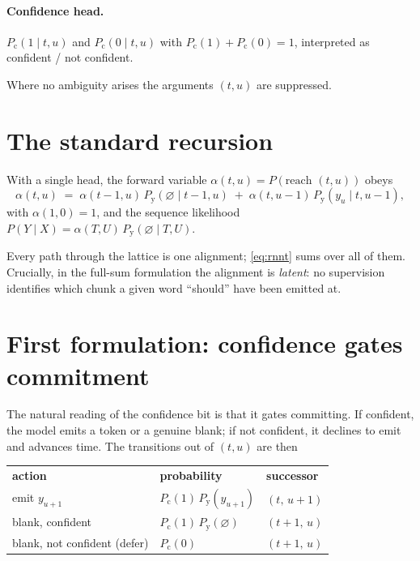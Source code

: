 \documentclass[11pt]{article}
\newcommand{\blank}{\varnothing}
\newcommand{\Py}{P_{\mathrm{y}}}
\newcommand{\Pc}{P_{\mathrm{c}}}
\begin{document}
\paragraph{Confidence head.} $\Pc(1 \mid t,u)$ and $\Pc(0 \mid t,u)$ with
$\Pc(1)+\Pc(0)=1$, interpreted as confident / not confident.

Where no ambiguity arises the arguments $(t,u)$ are suppressed.

\section{The standard recursion}

With a single head, the forward variable
$\alpha(t,u) = P(\text{reach } (t,u))$ obeys
\begin{equation}
  \alpha(t,u) \;=\; \alpha(t-1,u)\,\Py(\blank \mid t-1,u)
                 \;+\; \alpha(t,u-1)\,\Py(y_u \mid t,u-1),
  \label{eq:rnnt}
\end{equation}
with $\alpha(1,0)=1$, and the sequence likelihood
$P(Y \mid X) = \alpha(T,U)\,\Py(\blank \mid T,U)$.

Every path through the lattice is one alignment; \eqref{eq:rnnt} sums over all of
them. Crucially, in the full-sum formulation the alignment is \emph{latent}: no
supervision identifies which chunk a given word ``should'' have been emitted at.

\section{First formulation: confidence gates commitment}
\label{sec:gating}

The natural reading of the confidence bit is that it gates committing. If
confident, the model emits a token or a genuine blank; if not confident, it
declines to emit and advances time. The transitions out of $(t,u)$ are then

\begin{center}
\begin{tabular}{lll}
\textbf{action} & \textbf{probability} & \textbf{successor} \\[2pt]
emit $y_{u+1}$                 & $\Pc(1)\,\Py(y_{u+1})$ & $(t,\,u+1)$ \\
blank, confident               & $\Pc(1)\,\Py(\blank)$  & $(t+1,\,u)$ \\
blank, not confident (defer)   & $\Pc(0)$               & $(t+1,\,u)$ \\
\end{tabular}
\end{center}
\end{document}
